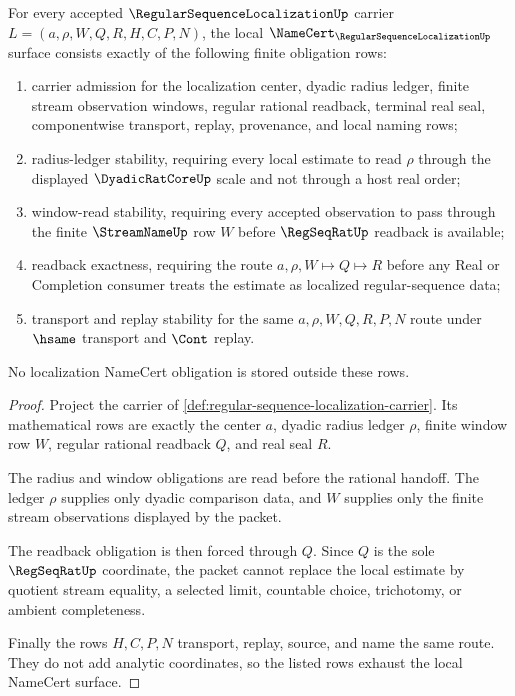 \begin{theorem}
\label{thm:regular-sequence-localization-namecert-obligations}
For every accepted $\RegularSequenceLocalizationUp$ carrier $L=(a,\rho,W,Q,R,H,C,P,N)$, the local $\NameCert_{\RegularSequenceLocalizationUp}$ surface consists exactly of the following finite obligation rows:
\begin{enumerate}
\item carrier admission for the localization center, dyadic radius ledger, finite stream observation windows, regular rational readback, terminal real seal, componentwise transport, replay, provenance, and local naming rows;
\item radius-ledger stability, requiring every local estimate to read $\rho$ through the displayed $\DyadicRatCoreUp$ scale and not through a host real order;
\item window-read stability, requiring every accepted observation to pass through the finite $\StreamNameUp$ row $W$ before $\RegSeqRatUp$ readback is available;
\item readback exactness, requiring the route $a,\rho,W \longmapsto Q \longmapsto R$ before any Real or Completion consumer treats the estimate as localized regular-sequence data;
\item transport and replay stability for the same $a,\rho,W,Q,R,P,N$ route under $\hsame$ transport and $\Cont$ replay.
\end{enumerate}
No localization NameCert obligation is stored outside these rows.
\end{theorem}
\begin{proof}
Project the carrier of \autoref{def:regular-sequence-localization-carrier}. Its mathematical rows are exactly the center $a$, dyadic radius ledger $\rho$, finite window row $W$, regular rational readback $Q$, and real seal $R$.

The radius and window obligations are read before the rational handoff. The ledger $\rho$ supplies only dyadic comparison data, and $W$ supplies only the finite stream observations displayed by the packet.

The readback obligation is then forced through $Q$. Since $Q$ is the sole $\RegSeqRatUp$ coordinate, the packet cannot replace the local estimate by quotient stream equality, a selected limit, countable choice, trichotomy, or ambient completeness.

Finally the rows $H,C,P,N$ transport, replay, source, and name the same route. They do not add analytic coordinates, so the listed rows exhaust the local NameCert surface.
\end{proof}

